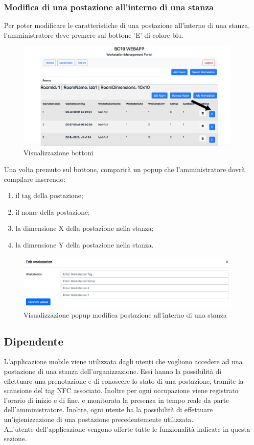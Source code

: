 \subsubsection{Modifica di una postazione all'interno di una stanza}
Per poter modificare le caratteristiche di una postazione all'interno di una stanza, l'amministratore deve premere sul bottone 'E' di colore blu.
\begin{figure}[H]
	\centering
	\includegraphics[width=15cm]{res/images/bottoneEditWorkstation.png}
	\caption{Visualizzazione bottoni}
\end{figure}
Una volta premuto sul bottone, comparirà un popup che l'amministratore dovrà compilare inserendo:
\begin{enumerate}
\item il tag della postazione;
\item il nome della postazione;
\item la dimensione X della postazione nella stanza;
\item la dimensione Y della postazione nella stanza.
\end{enumerate}
\begin{figure}[H]
	\centering
	\includegraphics[width=15cm]{res/images/editWorkstation.png}
	\caption{Visualizzazione popup modifica postazione all'interno di una stanza}
\end{figure}

\subsection{Dipendente}
L'applicazione mobile viene utilizzata dagli utenti che vogliono accedere ad una postazione di una stanza dell'organizzazione. Essi hanno la possibilità di effettuare una prenotazione e di conoscere lo stato di una postazione, tramite la scansione del tag NFC associato. Inoltre per ogni occupazione viene registrato l'orario di inizio e di fine, e monitorata la presenza in tempo reale da parte dell'amministratore. Inoltre, ogni utente ha la possibilità di effettuare un'igienizzazione di una postazione precedentemente utilizzata. 
\\All'utente dell'applicazione vengono offerte tutte le funzionalità indicate in questa sezione.
